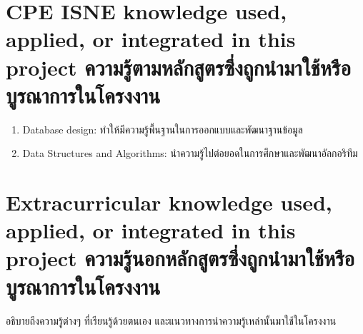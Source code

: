 
\section{\ifenglish%
\ifcpe CPE \else ISNE \fi knowledge used, applied, or integrated in this project
\else%
ความรู้ตามหลักสูตรซึ่งถูกนำมาใช้หรือบูรณาการในโครงงาน
\fi
}
\begin{enumerate}
  \item Database design: ทำให้มีความรู้พื้นฐานในการออกแบบและพัฒนาฐานข้อมูล
  \item Data Structures and Algorithms: นำความรู้ไปต่อยอดในการศึกษาและพัฒนาอัลกอริทึม
\end{enumerate}


\section{\ifenglish%
Extracurricular knowledge used, applied, or integrated in this project
\else%
ความรู้นอกหลักสูตรซึ่งถูกนำมาใช้หรือบูรณาการในโครงงาน
\fi
}

อธิบายถึงความรู้ต่างๆ ที่เรียนรู้ด้วยตนเอง และแนวทางการนำความรู้เหล่านั้นมาใช้ในโครงงาน
